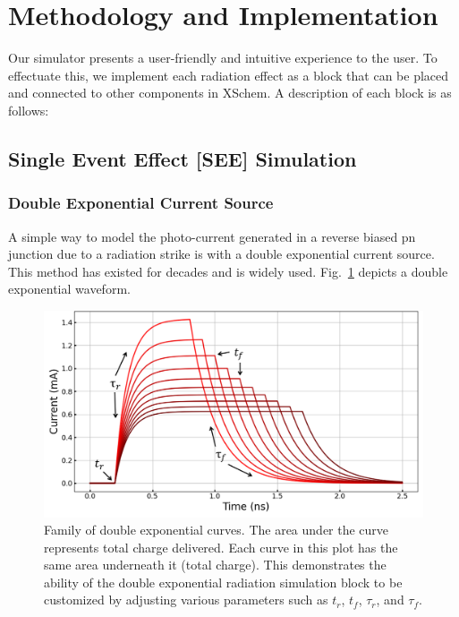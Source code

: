 \documentclass[conference]{IEEEtran}
\begin{document}
    \section{Methodology and Implementation}\label{sec:methodology-and-implementation}
    Our simulator presents a user-friendly and intuitive experience to the user.
    To effectuate this, we implement each radiation effect as a block that can be placed and connected to other components in XSchem.
    A description of each block is as follows:

    

    \subsection{Single Event Effect [SEE] Simulation}\label{subsec:single-event-effect-[see]-simulation}

    \subsubsection{Double Exponential Current Source}
    A simple way to model the photo-current generated in a reverse biased pn junction due to a radiation strike is with a double exponential current source.
    This method has existed for decades and is widely used.
    Fig.~\ref{fig:double_exp} depicts a double exponential waveform.

    \begin{figure}[htbp]
        \centering
        \includegraphics[width=0.95\linewidth]{double_exp_param_no_title}
        \caption{Family of double exponential curves. The area under the curve represents total charge delivered. Each curve in this plot has the same area underneath it (total charge). This demonstrates the ability of the double exponential radiation simulation block to be customized by adjusting various parameters such as \(t_r\), \(t_f\), \(\tau_r\), and \(\tau_f\).}
        \label{fig:double_exp}
    \end{figure}
    
\end{document}
